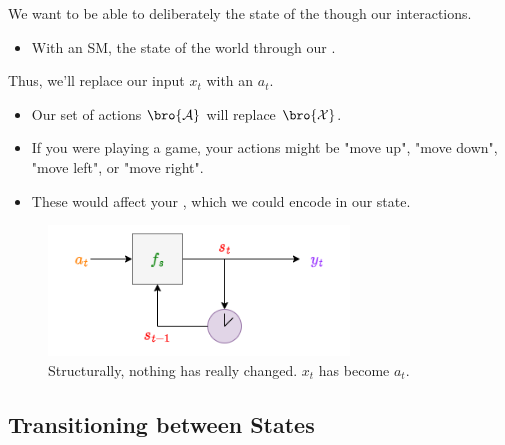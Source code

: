         \begin{concept}
            We want to be able to deliberately  the state of the  though our interactions.

            \begin{itemize}
                \item With an SM,  the state of the world through our .
            \end{itemize}
            
            Thus, we'll replace our input $x_t$ with an  $a_t$.

            \begin{itemize}
                \item Our set of actions $\bro{\mathcal{A}}$ will replace $\bro{\mathcal{X}}$.
            \end{itemize}

        \end{concept}

        \begin{itemize}
            \item \miniex If you were playing a game, your actions might be "move up", "move down", "move left", or "move right".
            \item These would affect your , which we could encode in our state.
        \end{itemize}

        \begin{figure}[H]
            \centering
            \includegraphics[width=80mm,scale=0.5]{images/mdp_images/action.png}
            
            \caption*{Structurally, nothing has really changed. $x_t$ has become $a_t$.}
        \end{figure}




    \phantom{}

    \subsection{Transitioning between States}

